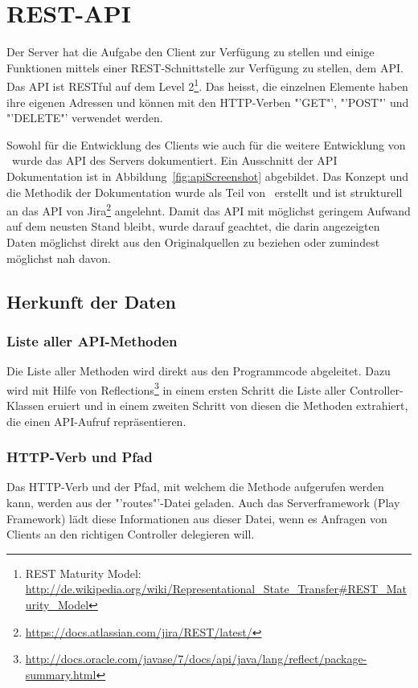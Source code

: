 \section{REST-API}
	Der Server hat die Aufgabe den Client zur Verfügung zu stellen
	und einige Funktionen mittels einer REST-Schnittstelle zur Verfügung zu stellen, dem API.
	Das API ist RESTful auf dem Level 2\footnote{REST Maturity Model: \url{http://de.wikipedia.org/wiki/Representational\_State\_Transfer\#REST\_Maturity\_Model}}.
	Das heisst, die einzelnen Elemente haben ihre eigenen Adressen
	und können mit den HTTP-Verben "'GET"', "'POST"' und "'DELETE"' verwendet werden.
	
	Sowohl für die Entwicklung des Clients wie auch für die weitere Entwicklung von \eeppi\ wurde das API des Servers dokumentiert.
	Ein Ausschnitt der API Dokumentation ist in Abbildung\ \ref{fig:apiScreenshot} abgebildet.
	Das Konzept und die Methodik der Dokumentation wurde als Teil von \eeppi\ erstellt
	und ist strukturell an das API von Jira\footnote{\url{https://docs.atlassian.com/jira/REST/latest/}} angelehnt.
	Damit das API mit möglichst geringem Aufwand auf dem neusten Stand bleibt, wurde darauf geachtet,
	die darin angezeigten Daten möglichst direkt aus den Originalquellen zu beziehen oder zumindest möglichst nah davon.
	
	\subsection{Herkunft der Daten}
		\subsubsection{Liste aller API-Methoden}
			Die Liste aller Methoden wird direkt aus den Programmcode abgeleitet.
			Dazu wird mit Hilfe von Reflections\footnote{\url{http://docs.oracle.com/javase/7/docs/api/java/lang/reflect/package-summary.html}} in einem ersten Schritt die Liste aller Controller-Klassen eruiert
			und in einem zweiten Schritt von diesen die Methoden extrahiert, die einen API-Aufruf repräsentieren.
		
		\subsubsection{HTTP-Verb und Pfad}
			Das HTTP-Verb und der Pfad, mit welchem die Methode aufgerufen werden kann,
			werden aus der "'routes"'-Datei geladen.
			Auch das Serverframework (Play Framework) lädt diese Informationen aus dieser Datei,
			wenn es Anfragen von Clients an den richtigen Controller delegieren will.
			
